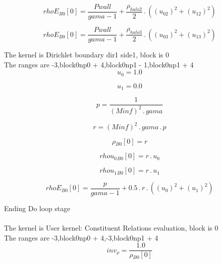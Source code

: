 \documentclass{article}
\begin{document}
\begin{dmath}{rhoE{_{B0}}}[{0}] = \frac{Pwall}{gama - 1} + \frac{\rho_{halo 2}}{2} \,.\, \left(\left(u_{02} \right)^{2} + \left(u_{12} \right)^{2}\right)\end{dmath}

\begin{dmath}{rhoE{_{B0}}}[{0}] = \frac{Pwall}{gama - 1} + \frac{\rho_{halo 3}}{2} \,.\, \left(\left(u_{03} \right)^{2} + \left(u_{13} \right)^{2}\right)\end{dmath}

\noindent The kernel is Dirichlet boundary dir1 side1, block is 0\\\noindent The ranges are -3,block0np0 + 4,block0np1 - 1,block0np1 + 4\\\begin{dmath}u_{0} = 1.0\end{dmath}

\begin{dmath}u_{1} = 0.0\end{dmath}

\begin{dmath}p = \frac{1}{\left(Minf \right)^{2} \,.\, gama}\end{dmath}

\begin{dmath}r = \left(Minf \right)^{2} \,.\, gama \,.\, p\end{dmath}

\begin{dmath}{\rho{_{B0}}}[{0}] = r\end{dmath}

\begin{dmath}{rhou_{0}{_{B0}}}[{0}] = r \,.\, u_{0}\end{dmath}

\begin{dmath}{rhou_{1}{_{B0}}}[{0}] = r \,.\, u_{1}\end{dmath}

\begin{dmath}{rhoE{_{B0}}}[{0}] = \frac{p}{gama - 1} + 0.5 \,.\, r \,.\, \left(\left(u_{0} \right)^{2} + \left(u_{1} \right)^{2}\right)\end{dmath}

\noindent Ending Do loop stage\\
\\\noindent The kernel is User kernel: Constituent Relations evaluation, block is 0\\\noindent The ranges are -3,block0np0 + 4,-3,block0np1 + 4\\\begin{dmath}inv_{\rho} = \frac{1.0}{{\rho{_{B0}}}[{0}]}\end{dmath}
\end{document}

